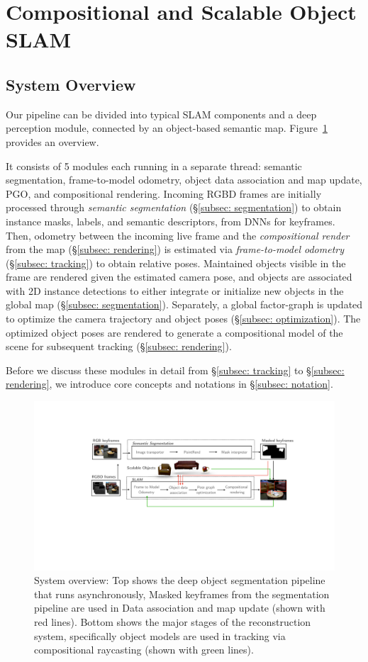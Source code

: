 \section{Compositional and Scalable Object SLAM} \label{sec: methodology}

 \subsection{System Overview}
Our pipeline can be divided into typical SLAM components and a deep perception module, connected by an object-based semantic map. Figure~\ref{fig:overview} provides an overview.

%
It consists of 5 modules each running in a separate thread: semantic segmentation, frame-to-model odometry, object data association and map update, PGO, and compositional rendering.
%
Incoming RGBD frames are initially processed through  \textit{semantic segmentation} (\S\ref{subsec: segmentation})  to obtain instance masks, labels, and semantic descriptors, from DNNs for keyframes.
%
Then, odometry between the incoming live frame and the \textit{compositional render} from the map (\S\ref{subsec: rendering}) is estimated via \textit{frame-to-model odometry} (\S\ref{subsec: tracking}) to obtain relative poses.
%
Maintained objects visible in the frame are rendered given the estimated camera pose, and objects are associated with 2D instance detections to either integrate or initialize new objects in the global map (\S\ref{subsec: segmentation}).
%
Separately, a global factor-graph is updated to optimize the camera trajectory and object poses (\S\ref{subsec: optimization}). The optimized object poses are rendered to generate a compositional model of the scene for subsequent tracking (\S\ref{subsec: rendering}).

Before we discuss these modules in detail from \S\ref{subsec: tracking} to \S\ref{subsec: rendering}, we introduce core concepts and notations in \S\ref{subsec: notation}.

 \begin{figure}[htbp]
 	\centering
    \includegraphics[width=\linewidth]{figs/icra2021-compressed.pdf}
    \caption{\label{fig:overview} System overview: Top shows the deep object segmentation pipeline that runs asynchronously, Masked keyframes from the segmentation pipeline are used in Data association and map update (shown with red lines). Bottom shows the major stages of the reconstruction system, specifically object models are used in tracking via compositional raycasting (shown with green lines).}
 \end{figure}
